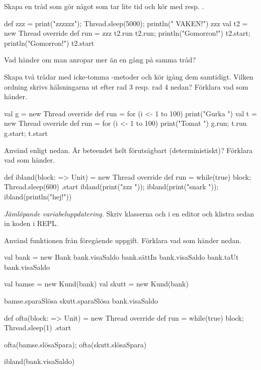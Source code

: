 \Subtask Skapa en tråd som gör något som tar lite tid och kör med  resp. .
\begin{REPL}
def zzz = { print("zzzzzz"); Thread.sleep(5000); println(" VAKEN!")}
zzz
val t2 = new Thread{ override def run = zzz }
t2.run
t2.run; println("Gomorron!")
t2.start; println("Gomorron!")
t2.start
\end{REPL}

\Subtask Vad händer om man anropar  mer än en gång på samma tråd?


\Subtask Skapa två trådar med icke-tomma -metoder och kör igång dem samtidigt. Vilken ordning skrivs hälsningarna ut efter rad 3 resp. rad 4 nedan? Förklara vad som händer.
\begin{REPL}
val g = new Thread{ override def run = for (i <- 1 to 100) print("Gurka ") }
val t = new Thread{ override def run = for (i <- 1 to 100) print("Tomat ") }
g.run; t.run
g.start; t.start
\end{REPL}

\Subtask Använd  enligt nedan. Är beteendet helt förutsägbart (deterministiskt)? Förklara vad som händer.
\begin{REPL}
def ibland(block: => Unit) = new Thread {
  override def run = while(true) { block; Thread.sleep(600) }
}.start
ibland(print("zzz ")); ibland(print("snark ")); ibland(println("hej!")) 
\end{REPL}


\Task \emph{Jämlöpande variabeluppdatering.} Skriv klasserna  och  i en editor och klistra sedan in koden i REPL.


\Subtask Använd funktionen  från föregående uppgift. Förklara vad som händer nedan.

\begin{REPL}
val bank = new Bank
bank.visaSaldo
bank.sättIn
bank.visaSaldo
bank.taUt
bank.visaSaldo

val bamse = new Kund(bank)
val skutt = new Kund(bank)

bamse.sparaSlösa
skutt.sparaSlösa
bank.visaSaldo

def ofta(block: => Unit) = new Thread {
  override def run = while(true) { block; Thread.sleep(1) }
}.start

ofta(bamse.slösaSpara); ofta(skutt.slösaSpara)

ibland(bank.visaSaldo)
\end{REPL}


